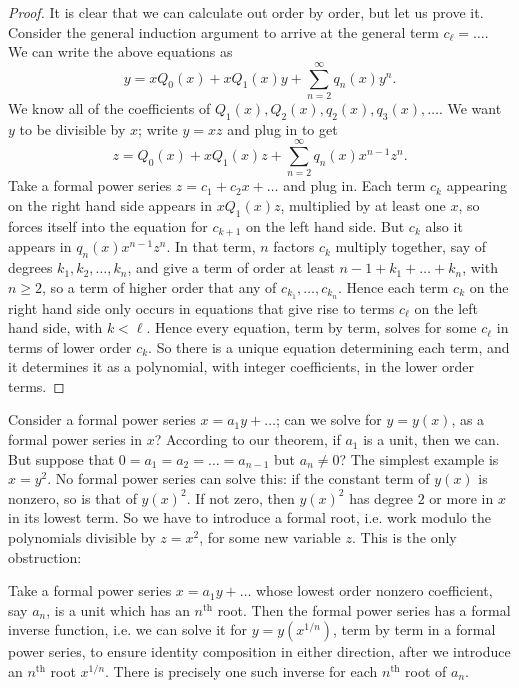 \begin{proof}
It is clear that we can calculate out order by order, but let us prove it.
Consider the general induction argument to arrive at the general term \(c_{\ell}=\dots\). 
We can write the above equations as
\[
y=xQ_0(x)+xQ_1(x)y+\sum_{n=2}^{\infty} q_n(x)y^n.
\]
We know all of the coefficients of \(Q_1(x),Q_2(x),q_2(x),q_3(x),\dots\).
We want \(y\) to be divisible by \(x\); write \(y=xz\) and plug in to get
\[
z=Q_0(x)+xQ_1(x)z+\sum_{n=2}^{\infty} q_n(x)x^{n-1}z^n.
\]
Take a formal power series \(z=c_1+c_2x+\dots\) and plug in.
Each term \(c_k\) appearing on the right hand side appears in \(xQ_1(x)z\), multiplied by at least one \(x\), so forces itself into the equation for \(c_{k+1}\) on the left hand side.
But \(c_k\) also it appears in \(q_n(x)x^{n-1}z^n\).
In that term, \(n\) factors \(c_k\) multiply together, say of degrees \(k_1,k_2,\dots,k_n\), and give a term of order at least \(n-1+k_1+\dots+k_n\), with \(n\ge 2\), so a term of higher order that any of \(c_{k_1},\dots,c_{k_n}\).
Hence each term \(c_k\) on the right hand side only occurs in equations that give rise to terms \(c_{\ell}\) on the left hand side, with \(k<\ell\).
Hence every equation, term by term, solves for some \(c_{\ell}\) in terms of lower order \(c_k\).
So there is a unique equation determining each term, and it determines it as a polynomial, with integer coefficients, in the lower order terms.
\end{proof}
\begin{example}
Consider a formal power series \(x=a_1y+\dots\); can we solve for \(y=y(x)\), as a formal power series in \(x\)?
According to our theorem, if \(a_1\) is a unit, then we can.
But suppose that \(0=a_1=a_2=\dots=a_{n-1}\) but \(a_n\ne 0\)?
The simplest example is \(x=y^2\).
No formal power series can solve this: if the constant term of \(y(x)\) is nonzero, so is that of \(y(x)^2\).
If not zero, then \(y(x)^2\) has degree \(2\) or more in \(x\) in its lowest term.
So we have to introduce a formal root, i.e. work modulo the polynomials divisible by \(z=x^2\), for some new variable \(z\).
This is the only obstruction:
\end{example}
\begin{theorem}
Take a formal power series \(x=a_1y+\dots\) whose lowest order nonzero coefficient, say \(a_n\), is a unit which has an \(n^{\text{th}}\) root.
Then the formal power series has a formal inverse function, i.e. we can solve it for \(y=y(x^{1/n})\), term by term in a formal power series, to ensure identity composition in either direction, after we introduce an \(n^{\text{th}}\) root \(x^{1/n}\).
There is precisely one such inverse for each \(n^{\text{th}}\) root of \(a_n\).
\end{theorem}
